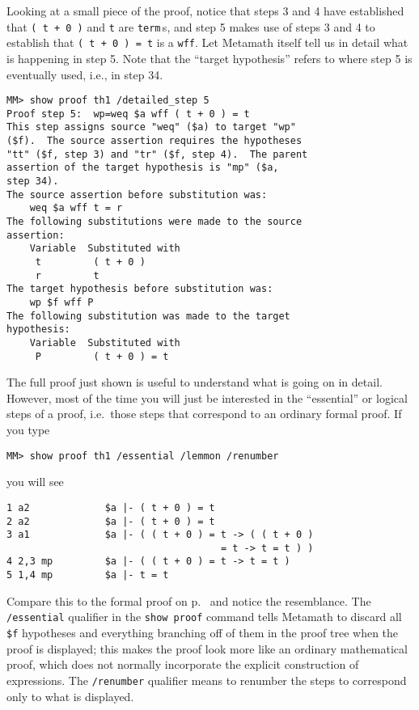 Looking at a small piece of the proof, notice that steps 3 and 4 have
established that
\texttt{( t + 0 )} and \texttt{t} are \texttt{term}\,s, and step 5 makes use of steps 3 and
4 to establish that \texttt{( t + 0 ) = t} is a \texttt{wff}.  Let Metamath
itself tell us in detail what is happening in step 5.  Note that the
``target hypothesis'' refers to where step 5 is eventually used, i.e., in step
34.
\begin{verbatim}
MM> show proof th1 /detailed_step 5
Proof step 5:  wp=weq $a wff ( t + 0 ) = t
This step assigns source "weq" ($a) to target "wp"
($f).  The source assertion requires the hypotheses
"tt" ($f, step 3) and "tr" ($f, step 4).  The parent
assertion of the target hypothesis is "mp" ($a,
step 34).
The source assertion before substitution was:
    weq $a wff t = r
The following substitutions were made to the source
assertion:
    Variable  Substituted with
     t         ( t + 0 )
     r         t
The target hypothesis before substitution was:
    wp $f wff P
The following substitution was made to the target
hypothesis:
    Variable  Substituted with
     P         ( t + 0 ) = t
\end{verbatim}

The full proof just shown is useful to understand what is going on in detail.
However, most of the time you will just be interested in
the ``essential'' or logical steps of a proof, i.e.\ those steps
that correspond to an
ordinary formal proof.  If you type
\begin{verbatim}
MM> show proof th1 /essential /lemmon /renumber
\end{verbatim}
you will see\label{demoproof}
\begin{verbatim}
1 a2             $a |- ( t + 0 ) = t
2 a2             $a |- ( t + 0 ) = t
3 a1             $a |- ( ( t + 0 ) = t -> ( ( t + 0 )
                                     = t -> t = t ) )
4 2,3 mp         $a |- ( ( t + 0 ) = t -> t = t )
5 1,4 mp         $a |- t = t
\end{verbatim}
Compare this to the formal proof on p.~\pageref{zeroproof} and
notice the resemblance.  The \texttt{/essential} qualifier in the \texttt{show
proof} command tells Metamath to discard all \texttt{\$f} hypotheses and everything branching off of them in the proof tree
when the proof is displayed; this makes the proof look more like an ordinary
mathematical proof, which does not normally incorporate the explicit
construction of expressions.  The \texttt{/renumber} qualifier means to renumber
the steps to correspond only to what is displayed.

